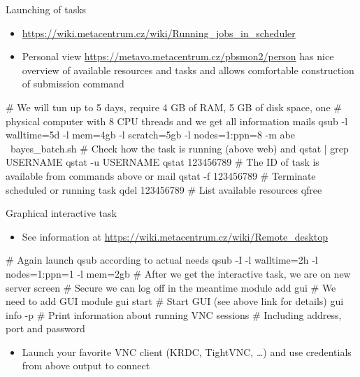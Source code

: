 \documentclass[compress, ucs, xelatex, 11pt, xcolor=svgnames,
  hyperref={
    bookmarks=true,
    unicode=true,
    colorlinks=true,
    pdftitle={Linux, command line and MetaCentrum},
    plainpages=false,
    pdfauthor={Vojtech Zeisek},
    pdfsubject={Course about use of Linux command line, writing shell scripts and using MetaCentrum of CESNET},
    pdfcreator={XeLaTeX},
    pdfkeywords={Linux, GNU, BASH, shell, command line, MetaCentrum},
    linkcolor=Red,
    anchorcolor=Blue,
    citecolor=Purple,
    filecolor=DodgerBlue,
    menucolor=DarkOrchid,
    urlcolor=DeepSkyBlue,
    pdftex},
  url={hyphens, lowtilde} %
  ]{beamer}
\begin{document}
\begin{frame}[fragile]{Launching of tasks}
\begin{itemize}
  \item \url{https://wiki.metacentrum.cz/wiki/Running_jobs_in_scheduler}
  \item Personal view \url{https://metavo.metacentrum.cz/pbsmon2/person} has nice overview of available resources and tasks and allows comfortable construction of submission command
\end{itemize}
  \begin{bashcode}
    # We will tun up to 5 days, require 4 GB of RAM, 5 GB of disk space, one
    # physical computer with 8 CPU threads and we get all information mails
    qsub -l walltime=5d -l mem=4gb -l scratch=5gb -l nodes=1:ppn=8 -m abe \
      bayes_batch.sh
    # Check how the task is running (above web) and
    qstat | grep USERNAME
    qstat -u USERNAME
    qstat 123456789 # The ID of task is available from commands above or mail
    qstat -f 123456789
    # Terminate scheduled or running task
    qdel 123456789
    # List available resources
    qfree
  \end{bashcode}
\end{frame}

\begin{frame}[fragile]{Graphical interactive task}
\begin{itemize}
  \item See information at \url{https://wiki.metacentrum.cz/wiki/Remote_desktop}
\end{itemize}
  \begin{bashcode}
    # Again launch qsub according to actual needs
    qsub -I -l walltime=2h -l nodes=1:ppn=1 -l mem=2gb
    # After we get the interactive task, we are on new server
    screen # Secure we can log off in the meantime
    module add gui # We need to add GUI module
    gui start # Start GUI (see above link for details)
    gui info -p # Print information about running VNC sessions
                # Including address, port and password
  \end{bashcode}
\begin{itemize}
  \item Launch your favorite VNC client (KRDC, TightVNC, \ldots) and use credentials from above output to connect
\end{itemize}
\end{frame}
\end{document}
